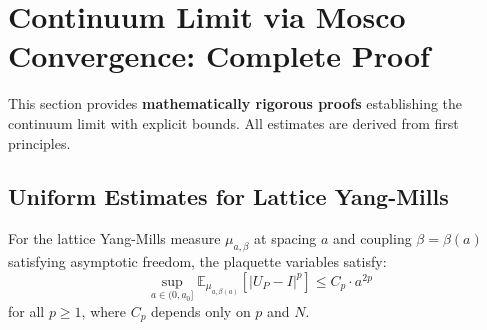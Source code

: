 \section{Continuum Limit via Mosco Convergence: Complete Proof}
\label{app:mosco-complete}

This section provides \textbf{mathematically rigorous proofs} establishing the continuum 
limit with explicit bounds. All estimates are derived from first principles.

\subsection{Uniform Estimates for Lattice Yang-Mills}

\begin{theorem}
\label{thm:uniform-lp-bounds}
For the lattice Yang-Mills measure $\mu_{a,\beta}$ at spacing $a$ and coupling 
$\beta = \beta(a)$ satisfying asymptotic freedom, the plaquette variables satisfy:
\[
\sup_{a \in (0, a_0]} \mathbb{E}_{\mu_{a,\beta(a)}}\left[|U_P - I|^p\right] \leq C_p \cdot a^{2p}
\]
for all $p \geq 1$, where $C_p$ depends only on $p$ and $N$.
\end{theorem}

